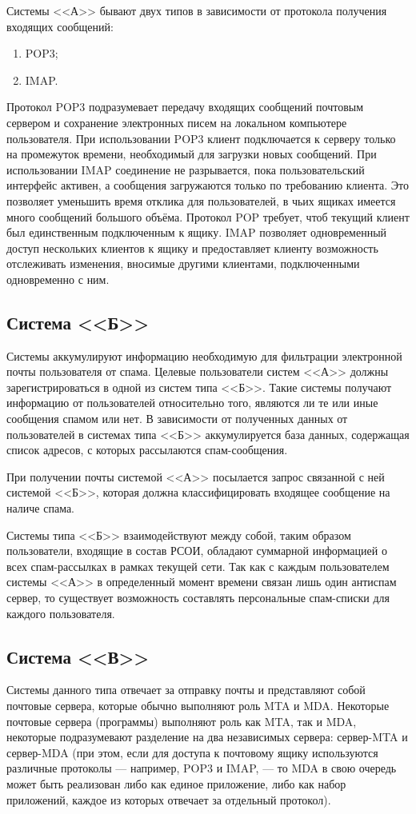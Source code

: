 Системы <<А>> бывают двух типов в зависимости от протокола получения входящих сообщений:
\begin{enumerate}
\item{POP3;}
\item{IMAP.}
\end{enumerate}

Протокол POP3 подразумевает передачу входящих сообщений почтовым сервером и сохранение электронных писем на локальном компьютере пользователя. При использовании POP3 клиент подключается к серверу только на промежуток времени, необходимый для загрузки новых сообщений. При использовании IMAP соединение не разрывается, пока пользовательский интерфейс активен, а сообщения загружаются только по требованию клиента. Это позволяет уменьшить время отклика для пользователей, в чьих ящиках имеется много сообщений большого объёма.
Протокол POP требует, чтоб текущий клиент был единственным подключенным к ящику. IMAP позволяет одновременный доступ нескольких клиентов к ящику и предоставляет клиенту возможность отслеживать изменения, вносимые другими клиентами, подключенными одновременно с ним.


\subsection{Система <<Б>>}
Системы аккумулируют информацию необходимую для фильтрации электронной почты пользователя от спама. Целевые пользователи систем <<А>> должны зарегистрироваться в одной из систем типа <<Б>>. Такие системы получают информацию от пользователей относительно того, являются ли те или иные сообщения спамом или нет. В зависимости от полученных данных от пользователей в системах типа <<Б>> аккумулируется база данных, содержащая список адресов, с которых рассылаются спам-сообщения.

При получении почты системой <<А>> посылается запрос связанной с ней системой <<Б>>, которая должна классифицировать входящее сообщение на наличе спама.

Системы типа <<Б>> взаимодействуют между собой, таким образом пользователи, входящие в состав РСОИ, обладают суммарной информацией о всех спам-рассылках в рамках текущей сети. Так как с каждым пользователем системы <<А>>  в определенный момент времени связан лишь один антиспам сервер, то существует возможность составлять персональные спам-списки для каждого пользователя. 


\subsection{Система <<В>>}
 Системы данного типа отвечает за отправку почты и представляют собой почтовые сервера, которые обычно выполняют роль MTA и MDA. Некоторые почтовые сервера (программы) выполняют роль как MTA, так и MDA, некоторые подразумевают разделение на два независимых сервера: сервер-MTA и сервер-MDA (при этом, если для доступа к почтовому ящику используются различные протоколы — например, POP3 и IMAP, — то MDA в свою очередь может быть реализован либо как единое приложение, либо как набор приложений, каждое из которых отвечает за отдельный протокол).

